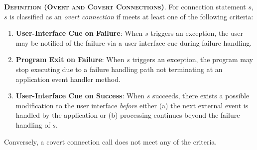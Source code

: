 \begin{description}[leftmargin=0cm,listparindent=0pt,itemindent=0cm]
\item \textsc{\bfseries{Definition (Overt and Covert
    Connections)}}.  For connection statement $s$, $s$ is classified as
  an {\it overt connection} if meets at least one of the following
  criteria:
  
\begin{enumerate}[leftmargin=0.5cm]

\item{\bf User-Interface Cue on Failure}: When $s$ triggers an exception,
  the user may be notified of the failure via a user interface cue
  during failure handling.

\item {\bf Program Exit on Failure}: When $s$ triggers an exception, the
  program may stop executing due to a failure handling path not
  terminating at an application event handler method.

\item {\bf User-Interface Cue on Success}: When $s$ succeeds, there
  exists a possible modification to the user interface {\it before}
  either (a) the next external event is handled by the application or
  (b) processing continues beyond the failure handling of $s$.

\end{enumerate}

\noindent Conversely, a covert connection call does not meet
any of the criteria.  

\end{description}





